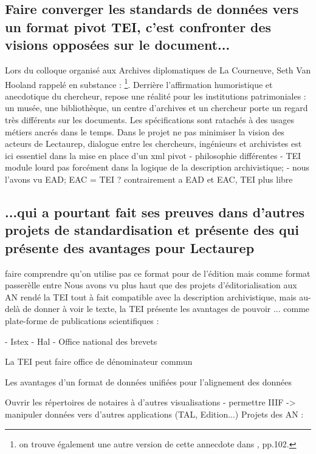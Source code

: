 \subsection{Faire converger les standards de données vers un format pivot TEI, c'est confronter des visions opposées sur le document...}

Lors du colloque organisé aux Archives diplomatiques de La Courneuve, Seth Van Hooland rappelé en substance : \footnote{\cite{hooland_lapplication_2019} on trouve également une autre version de cette annecdote dans \cite{gillet_introduction_2016}, pp.102.}. Derrière l'affirmation humoristique et anecdotique du chercheur, repose une réalité pour les institutions patrimoniales : un musée, une bibliothèque, un centre d'archives et un chercheur porte un regard très différents sur les documents. Les spécifications sont ratachés à des usages métiers ancrés dans le temps.  Dans le projet ne pas minimiser la vision des acteurs de Lectaurep, dialogue entre les chercheurs, ingénieurs et archivistes est ici essentiel dans la mise en place d'un xml pivot
- philosophie différentes
- TEI module lourd pas forcément dans la logique de la description archivistique;
- nous l'avons vu EAD; EAC = TEI ? 
contrairement a EAD et EAC, TEI plus libre 


\subsection{...qui a pourtant fait ses preuves dans d'autres projets de standardisation et présente des qui présente des avantages pour Lectaurep}

faire comprendre qu'on utilise pas ce format pour de l'édition mais comme format passerèlle entre
Nous avons vu plus haut que des projets d'éditorialisation aux AN rendé la TEI tout à fait compatible avec la description archivistique, mais au-delà de donner à voir le texte, la TEI présente les avantages de pouvoir ...
comme 
plate-forme de publications scientifiques :

- Istex
- Hal 
- Office national des brevets

La TEI peut faire office de dénominateur commun 

Les avantages d'un format de données unifiées pour l'alignement des données

Ouvrir les répertoires de notaires à d'autres visualisations
- permettre IIIF
-> manipuler données vers d'autres applications (TAL, Edition...)
Projets des AN :

